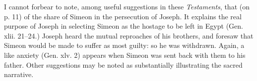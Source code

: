 I cannot forbear to note, among useful suggestions in these \emph{Testaments}, that (on p. 11) of the share of Simeon in the persecution of Joseph. It explains the real purpose of Joseph in selecting Simeon as the hostage to be left in Egypt (Gen. xlii. 21–24.) Joseph heard the mutual reproaches of his brothers, and foresaw that Simeon would be made to suffer as most guilty: so he was withdrawn. Again, a like anxiety (Gen. xlv. 2) appears when Simeon was sent back with them to his father. Other suggestions may be noted as substantially illustrating the sacred narrative.
